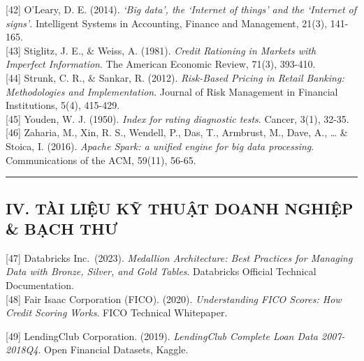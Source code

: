 \documentclass[
  13pt,
  a4paper,
]{report}
\begin{document}
{[}42{]} O'Leary, D. E. (2014). \emph{`Big data', the `Internet of
things' and the `Internet of signs'}. Intelligent Systems in Accounting,
Finance and Management, 21(3), 141-165.\\
{[}43{]} Stiglitz, J. E., \& Weiss, A. (1981). \emph{Credit Rationing in
Markets with Imperfect Information}. The American Economic Review,
71(3), 393-410.\\
{[}44{]} Strunk, C. R., \& Sankar, R. (2012). \emph{Risk-Based Pricing
in Retail Banking: Methodologies and Implementation}. Journal of Risk
Management in Financial Institutions, 5(4), 415-429.\\
{[}45{]} Youden, W. J. (1950). \emph{Index for rating diagnostic tests}.
Cancer, 3(1), 32-35.\\
{[}46{]} Zaharia, M., Xin, R. S., Wendell, P., Das, T., Armbrust, M.,
Dave, A., \ldots{} \& Stoica, I. (2016). \emph{Apache Spark: a unified
engine for big data processing}. Communications of the ACM, 59(11),
56-65.

\begin{center}\rule{0.5\linewidth}{0.5pt}\end{center}

\subsection{IV. TÀI LIỆU KỸ THUẬT DOANH NGHIỆP \& BẠCH
THƯ}\label{iv.-tuxe0i-liux1ec7u-kux1ef9-thuux1eadt-doanh-nghiux1ec7p-bux1ea1ch-thux1b0}

{[}47{]} Databricks Inc.~(2023). \emph{Medallion Architecture: Best
Practices for Managing Data with Bronze, Silver, and Gold Tables}.
Databricks Official Technical Documentation.\\
{[}48{]} Fair Isaac Corporation (FICO). (2020). \emph{Understanding FICO
Scores: How Credit Scoring Works}. FICO Technical Whitepaper.

{[}49{]} LendingClub Corporation. (2019). \emph{LendingClub Complete
Loan Data 2007-2018Q4}. Open Financial Datasets, Kaggle.
\end{document}

